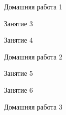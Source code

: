 \begin{homework}[number=1]
	\begin{listofex}
		\item Домашняя работа 1
	\end{listofex}
\end{homework}

\begin{class}[number=3]
	\begin{listofex}
		\item Занятие 3 
	\end{listofex}
\end{class}

\begin{class}[number=4]
	\begin{listofex}
		\item Занятие 4
	\end{listofex}
\end{class}

\begin{homework}[number=2]
	\begin{listofex}
		\item Домашняя работа 2
	\end{listofex}
\end{homework}

\begin{class}[number=5]
	\begin{listofex}
		\item Занятие 5
	\end{listofex}
\end{class}

\begin{class}[number=6]
	\begin{listofex}
		\item Занятие 6
	\end{listofex}
\end{class}

\begin{homework}[number=3]
	\begin{listofex}
		\item Домашняя работа 3
	\end{listofex}
\end{homework}

